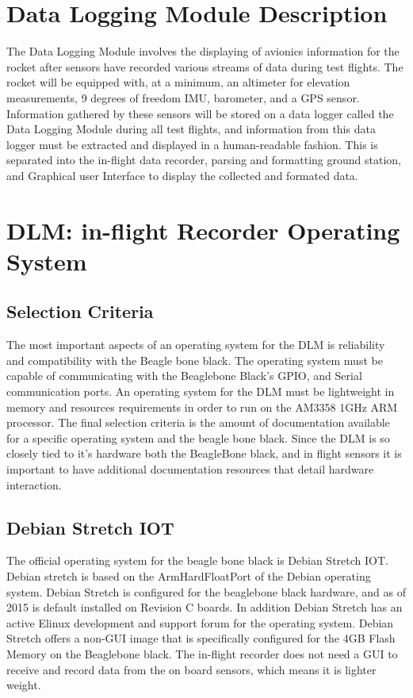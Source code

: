 \documentclass[onecolumn, draftclsnofoot,10pt, compsoc]{IEEEtran}
\begin{document}
\section{Data Logging Module Description}
The Data Logging Module involves the displaying of avionics information for the rocket after sensors have recorded various streams of data during test flights.
The rocket will be equipped with, at a minimum, an altimeter for elevation measurements, 9 degrees of freedom IMU, barometer, and a GPS sensor. Information gathered by these sensors will be stored on a data logger called the Data Logging Module during all test flights, and information from this data logger must be extracted and displayed in a human-readable fashion. This is separated into the in-flight data recorder, parsing and formatting ground station, and Graphical user Interface to display the collected and formated data.
\section{DLM: in-flight Recorder Operating System}
\subsection{Selection Criteria}
The most important aspects of an operating system for the DLM is reliability and compatibility with the Beagle bone black. The operating system must be capable of communicating with the Beaglebone Black's GPIO, and Serial communication ports. An operating system for the DLM must be lightweight in memory and resources requirements in order to run on the AM3358 1GHz ARM processor. The final selection criteria is the amount of documentation available for a specific operating system and the beagle bone black. Since the DLM is so closely tied to it's hardware both the BeagleBone black, and in flight sensors it is important to have additional documentation resources that detail hardware interaction.
\subsection{Debian Stretch IOT}
The official operating system for the beagle bone black is Debian Stretch IOT. Debian stretch is based on the ArmHardFloatPort of the Debian operating system. Debian Stretch is configured for the beaglebone black hardware, and as of 2015 is default installed on Revision C boards. In addition Debian Stretch has an active Elinux development and support forum for the operating system. Debian Stretch offers a non-GUI image that is specifically configured for the 4GB Flash Memory on the Beaglebone black. The in-flight recorder does not need a GUI to receive and record data from the on board sensors, which means it is lighter weight.
\end{document}
